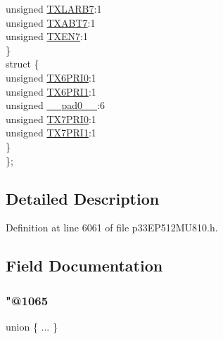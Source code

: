 \begin{DoxyCompactItemize}
\begin{tabbing}
\>\>unsigned \hyperlink{structtag_c2_t_r67_c_o_n_b_i_t_s_ac0204741553c3d09de799bfeb91cda28}{TXLARB7}:1\\
\>\>unsigned \hyperlink{structtag_c2_t_r67_c_o_n_b_i_t_s_adcff2b634fd77e2d9b794e24ef3ebf8f}{TXABT7}:1\\
\>\>unsigned \hyperlink{structtag_c2_t_r67_c_o_n_b_i_t_s_ad0ef0beedd94db4b5c0468da4c39b425}{TXEN7}:1\\
\>\} \\
\>struct \{\\
\>\>unsigned \hyperlink{structtag_c2_t_r67_c_o_n_b_i_t_s_afe2e8441e034e2d5689b82598e8d691e}{TX6PRI0}:1\\
\>\>unsigned \hyperlink{structtag_c2_t_r67_c_o_n_b_i_t_s_a529fa0e32de73bcf92a5fea3a931987f}{TX6PRI1}:1\\
\>\>unsigned \hyperlink{structtag_c2_t_r67_c_o_n_b_i_t_s_adf71f3d8410c1f1dbbc96680a92c49af}{\_\_pad0\_\_}:6\\
\>\>unsigned \hyperlink{structtag_c2_t_r67_c_o_n_b_i_t_s_a49e2a7c9ab7892910cf537cc4f236cdb}{TX7PRI0}:1\\
\>\>unsigned \hyperlink{structtag_c2_t_r67_c_o_n_b_i_t_s_a8ff1d2ac45265f631ac12645e6051900}{TX7PRI1}:1\\
\>\} \\
\}; \\

\end{tabbing}\end{DoxyCompactItemize}


\subsection{Detailed Description}


Definition at line 6061 of file p33\+E\+P512\+M\+U810.\+h.



\subsection{Field Documentation}
\mbox{\label{structtag_c2_t_r67_c_o_n_b_i_t_s_a747c44a53365fa4e37204e5d92f704e0}} 
\subsubsection{\texorpdfstring{"@1065}{@1065}}
{\footnotesize\ttfamily union \{ ... \} }

\mbox{\label{structtag_c2_t_r67_c_o_n_b_i_t_s_adf71f3d8410c1f1dbbc96680a92c49af}} 
